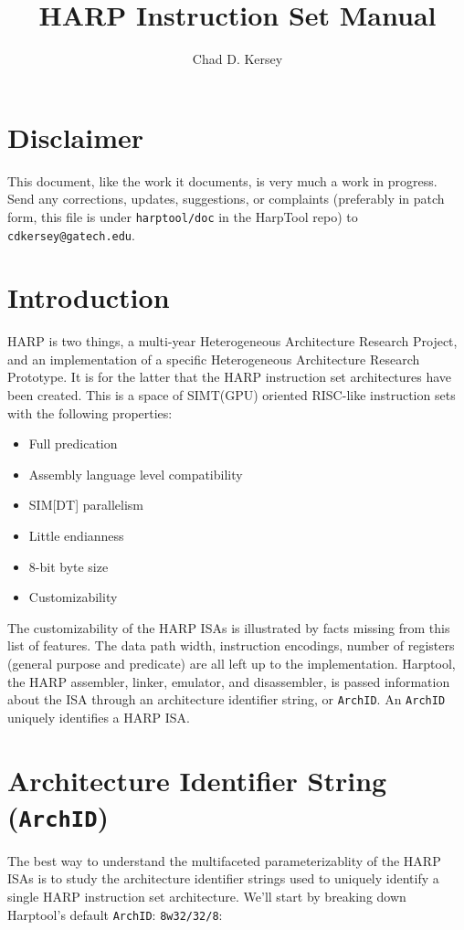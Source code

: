 \documentclass[10pt,letterpaper]{article}
\title{HARP Instruction Set Manual}
\author{Chad D. Kersey}
\begin{document}
\maketitle
\section*{Disclaimer}
This document, like the work it documents, is very much a work in progress.
Send any corrections, updates, suggestions, or complaints (preferably in patch form, this file is under \texttt{harptool/doc} in the HarpTool repo) to \texttt{cdkersey@gatech.edu}.

\section*{Introduction}
HARP is two things, a multi-year Heterogeneous Architecture Research Project, and an implementation of a specific Heterogeneous Architecture Research Prototype.
It is for the latter that the HARP instruction set architectures have been created.
This is a space of SIMT(GPU) oriented RISC-like instruction sets with the following properties:

\begin{itemize}
  \item{Full predication}
  \item{Assembly language level compatibility}
  \item{SIM[DT] parallelism}
  \item{Little endianness}
  \item{8-bit byte size}
  \item{Customizability}
\end{itemize}

The customizability of the HARP ISAs is illustrated by facts missing from this list of features.
The data path width, instruction encodings, number of registers (general purpose and predicate) are all left up to the implementation.
Harptool, the HARP assembler, linker, emulator, and disassembler, is passed information about the ISA through an architecture identifier string, or \texttt{ArchID}.
An \texttt{ArchID} uniquely identifies a HARP ISA.

\section{Architecture Identifier String (\texttt{ArchID})}
The best way to understand the multifaceted parameterizablity of the HARP ISAs is to study the architecture identifier strings used to uniquely identify a single HARP instruction set architecture.
We'll start by breaking down Harptool's default \texttt{ArchID}: \texttt{8w32/32/8}:
\end{document}
